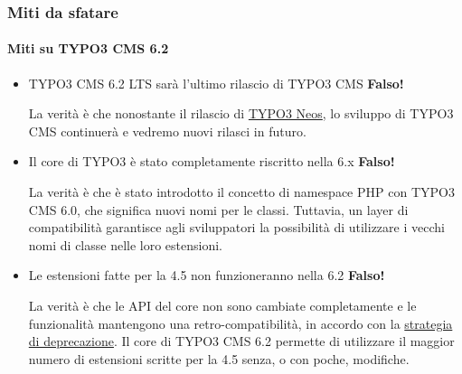 \begin{frame}[fragile]
	\frametitle{Miti da sfatare}
	\framesubtitle{Miti su TYPO3 CMS 6.2}

	\begin{itemize}
		\item TYPO3 CMS 6.2 LTS sarà l'ultimo rilascio di TYPO3 CMS
			\tabto{9cm}\color{red}\textbf{\textrightarrow Falso!}\color{black}

			\smaller
				La verità è che nonostante il rilascio di \href{http://neos.typo3.org}{TYPO3 Neos}, lo sviluppo di TYPO3 CMS continuerà e vedremo nuovi rilasci in futuro.
			\normalsize

		\item Il core di TYPO3 è stato completamente riscritto nella 6.x
			\tabto{9cm}\color{red}\textbf{\textrightarrow Falso!}\color{black}

			\smaller
				La verità è che è stato introdotto il concetto di namespace PHP con TYPO3 CMS 6.0, che significa nuovi nomi per le classi. Tuttavia, un layer di compatibilità garantisce agli sviluppatori la possibilità di utilizzare i vecchi nomi di classe nelle loro estensioni.
			\normalsize

		\item Le estensioni fatte per la 4.5 non funzioneranno nella 6.2
			\tabto{9cm}\color{red}\textbf{\textrightarrow Falso!}\color{black}

			\smaller
				La verità è che le API del core non sono cambiate completamente e le funzionalità mantengono una retro-compatibilità, in accordo con la \href{http://forge.typo3.org/projects/typo3v4-core/wiki/CoreDevPolicy}{strategia di deprecazione}. Il core di TYPO3 CMS 6.2 permette di utilizzare il maggior numero di estensioni scritte per la 4.5 senza, o con poche, modifiche.
			\normalsize

	\end{itemize}

\end{frame}


